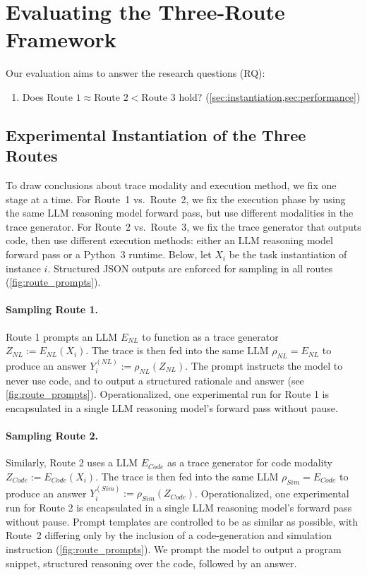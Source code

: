 \section{Evaluating the Three-Route Framework}
\label{sec:empirical}
Our evaluation aims to answer the research questions (RQ):
\begin{enumerate}
    \item[1)] Does $\text{Route~1} \approx \text{Route~2} < \text{Route~3}$ hold? (\cref{sec:instantiation,sec:performance})
\end{enumerate}


\subsection{Experimental Instantiation of the Three Routes}
\label{sec:instantiation}

To draw conclusions about trace modality and execution method, we fix one stage at a time. For Route~1 vs.\ Route~2, we fix the execution phase by using the same LLM reasoning model forward pass, but use different modalities in the trace generator. For Route~2 vs.\ Route~3, we fix the trace generator that outputs code, then use different execution methods: either an LLM reasoning model forward pass or a Python~3 runtime. Below, let $X_i$ be the task instantiation of instance $i$. Structured JSON outputs are enforced for sampling in all routes
(\cref{fig:route_prompts}).

\paragraph{Sampling Route 1.}  Route 1 prompts an LLM $E_{NL} $ to function as a trace generator $Z_{NL} := E_{NL}(X_i)$. The trace is then fed into the same LLM $\rho_{NL} = E_{NL}$ to produce an answer $Y_{i}^{(NL)} := \rho_{NL} (Z_{NL})$. The prompt instructs the model to never use code, and to output a structured rationale and answer (see \cref{fig:route_prompts}). Operationalized, one experimental run for Route 1 is encapsulated in a single LLM reasoning model's forward pass without pause.
\paragraph{Sampling Route 2.} Similarly, Route 2 uses a LLM $E_{Code}$ as a trace generator for code modality $Z_{Code} := E_{Code}(X_i)$. The trace is then fed into the same LLM $\rho_{Sim} = E_{Code}$ to produce an answer $Y_{i}^{(Sim)} := \rho_{Sim} (Z_{Code})$. Operationalized, one experimental run for Route 2 is encapsulated in a single LLM reasoning model's forward pass without pause. Prompt templates are controlled to be as similar as possible, with
Route~2 differing only by the inclusion of a code-generation and
simulation instruction (\cref{fig:route_prompts}). We prompt the model to output a program snippet, structured reasoning over the code, followed by an answer.
